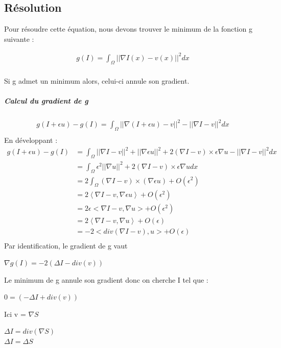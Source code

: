 \subsection{Résolution}
Pour résoudre cette équation, nous devons trouver le minimum de la fonction g suivante  : 
\begin{center}
\begin{equation}
\begin{aligned}
g(I) = \int_\Omega || \nabla I(x) - v(x)||^2 dx\\
\end{aligned}
\end{equation}
\end{center}
Si g admet un minimum alors, celui-ci annule son gradient. 
\subparagraph{Calcul du gradient de g}
\begin{equation*} 
\begin{aligned}
    g(I+\epsilon u) -g(I) =  \int_\Omega || \nabla (I+\epsilon u) - v||^2 - ||\nabla I -v ||^2 dx\\
\end{aligned}
\end{equation*}
En  développant : 
\begin{equation*} 
\left.
\begin{aligned}
    g(I+\epsilon u) -g(I) &=  \int_\Omega || \nabla I - v||^2+ ||\nabla \epsilon u||^2 +2(\nabla I - v)\times \epsilon \nabla u  - ||\nabla I -v ||^2 dx\\
  &=  \int_\Omega \epsilon ^2||\nabla u||^2 +2(\nabla I - v)\times \epsilon \nabla u dx\\
    & = 2\int_\Omega (\nabla I - v) \times (\nabla \epsilon u ) + O (\epsilon^2) \\ 
    & = 2\left<\nabla I - v, \nabla \epsilon u \right> + O (\epsilon^2) \\ 
      &  =   2\epsilon<\nabla I - v,  \nabla u> + O (\epsilon^2) \\ 
         &  = 2\left<\nabla I - v,  \nabla u \right> + O (\epsilon)\\ 
    & =  -2 <div(\nabla I - v), u > + O (\epsilon)\\
\end{aligned}
\right.
\end{equation*}
Par identification, le gradient de g vaut 
\begin{center}
		$\nabla g(I) = -2(\Delta I-div( v))$
\end{center} 
Le minimum de g annule son gradient donc on cherche I tel que : 
\begin{center}
		$0= (-\Delta I+div( v))$
\end{center}
Ici v = $\nabla S$ 
\begin{center}
		$\Delta I =div(\nabla S)$\\
		$\Delta I = \Delta S$
		
\end{center} 

